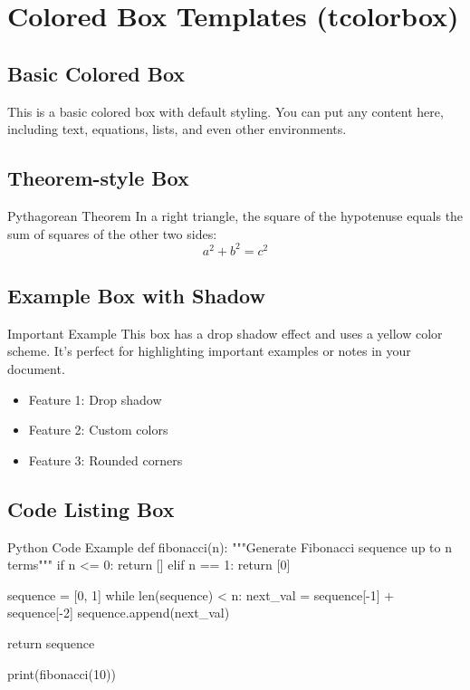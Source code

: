 \documentclass[a4paper,12pt]{article}
\begin{document}
\section{Colored Box Templates (tcolorbox)}

\subsection{Basic Colored Box}
\begin{basicbox}
This is a basic colored box with default styling. You can put any content here,
including text, equations, lists, and even other environments.
\end{basicbox}

\subsection{Theorem-style Box}
\begin{theobox}{Pythagorean Theorem}
In a right triangle, the square of the hypotenuse equals the sum of squares 
of the other two sides:
\[ a^2 + b^2 = c^2 \]
\end{theobox}

\subsection{Example Box with Shadow}
\begin{examplebox}{Important Example}
This box has a drop shadow effect and uses a yellow color scheme. It's perfect
for highlighting important examples or notes in your document.
\begin{itemize}
    \item Feature 1: Drop shadow
    \item Feature 2: Custom colors
    \item Feature 3: Rounded corners
\end{itemize}
\end{examplebox}

\subsection{Code Listing Box}
\begin{codebox}{Python Code Example}
def fibonacci(n):
    """Generate Fibonacci sequence up to n terms"""
    if n <= 0:
        return []
    elif n == 1:
        return [0]
    
    sequence = [0, 1]
    while len(sequence) < n:
        next_val = sequence[-1] + sequence[-2]
        sequence.append(next_val)
    
    return sequence

print(fibonacci(10))
\end{codebox}
\end{document}
